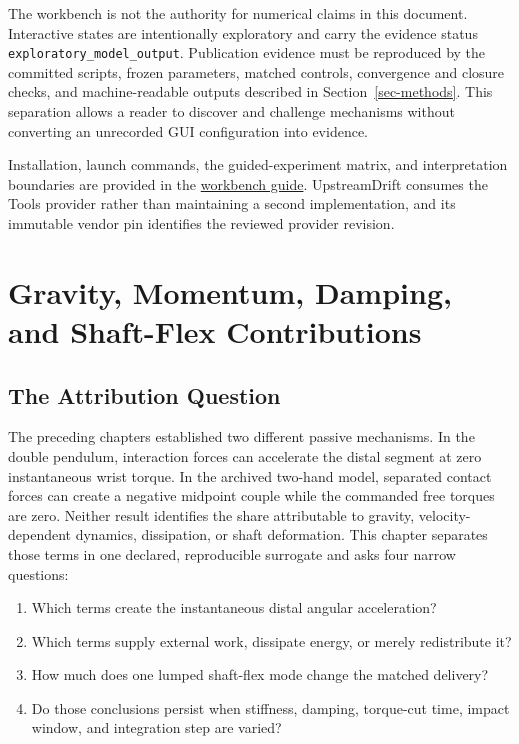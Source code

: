 \documentclass[
  letterpaper,
]{report}
\providecommand{\tightlist}{%
  \setlength{\itemsep}{0pt}\setlength{\parskip}{0pt}}
\begin{document}
The workbench is not the authority for numerical claims in this
document. Interactive states are intentionally exploratory and carry the
evidence status \texttt{exploratory\_model\_output}. Publication
evidence must be reproduced by the committed scripts, frozen parameters,
matched controls, convergence and closure checks, and machine-readable
outputs described in Section~\ref{sec-methods}. This separation allows a
reader to discover and challenge mechanisms without converting an
unrecorded GUI configuration into evidence.

Installation, launch commands, the guided-experiment matrix, and
interpretation boundaries are provided in the
\href{../COMPANION_WORKBENCH.md}{workbench guide}. UpstreamDrift
consumes the Tools provider rather than maintaining a second
implementation, and its immutable vendor pin identifies the reviewed
provider revision.

\chapter{Gravity, Momentum, Damping, and Shaft-Flex
Contributions}\label{sec-shaft-contributions}

\section{The Attribution Question}\label{sec-shaft-question}

The preceding chapters established two different passive mechanisms. In
the double pendulum, interaction forces can accelerate the distal
segment at zero instantaneous wrist torque. In the archived two-hand
model, separated contact forces can create a negative midpoint couple
while the commanded free torques are zero. Neither result identifies the
share attributable to gravity, velocity-dependent dynamics, dissipation,
or shaft deformation. This chapter separates those terms in one
declared, reproducible surrogate and asks four narrow questions:

\begin{enumerate}
\def\labelenumi{\arabic{enumi}.}
\tightlist
\item
  Which terms create the instantaneous distal angular acceleration?
\item
  Which terms supply external work, dissipate energy, or merely
  redistribute it?
\item
  How much does one lumped shaft-flex mode change the matched delivery?
\item
  Do those conclusions persist when stiffness, damping, torque-cut time,
  impact window, and integration step are varied?
\end{enumerate}
\end{document}
